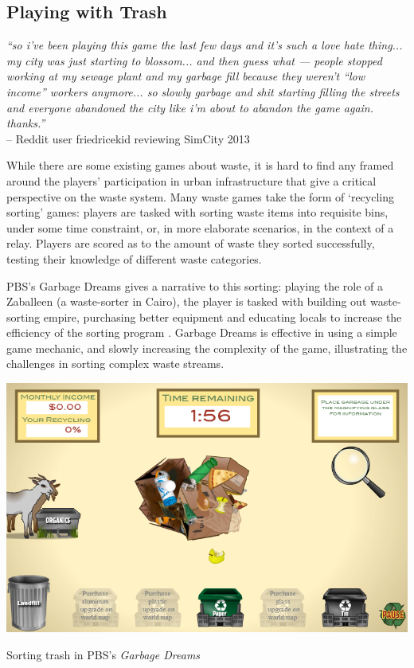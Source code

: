 \documentclass[nofonts,nols,justified,nobib]{tufte-book}
\begin{document}
\subsection*{Playing with Trash}

\begin{flushright}
\emph{``so i've been playing this game the last few days and it's such a love hate thing... my city was just starting to blossom... and then guess what --- people stopped working at my sewage plant and my garbage fill because they weren't ``low income'' workers anymore... so slowly garbage and shit starting filling the streets and everyone abandoned the city like i'm about to abandon the game again. thanks.''}\cite{friedricekid_is_2017}\\
-- Reddit user friedricekid reviewing SimCity 2013
\end{flushright}

While there are some existing games about waste, it is hard to find any framed around the players' participation in urban infrastructure that give a critical perspective on the waste system. Many waste games take the form of `recycling sorting' games: players are tasked with sorting waste items into requisite bins, under some time constraint, or, in more elaborate scenarios, in the context of a relay. Players are scored as to the amount of waste they sorted successfully, testing their knowledge of different waste categories. 

PBS's Garbage Dreams gives a narrative to this sorting: playing the role of a Zaballeen (a waste-sorter in Cairo), the player is tasked with building out waste-sorting empire, purchasing better equipment and educating locals to increase the efficiency of the sorting program \cite{iskander_garbage_2011}. Garbage Dreams is effective in using a simple game mechanic, and slowly increasing the complexity of the game, illustrating the challenges in sorting complex waste streams. 


\begin{marginfigure}
\includegraphics[width=\textwidth]{img/1/garbage-dreams-1.png}
\caption{Sorting trash in PBS's \emph{Garbage Dreams} \cite{iskander_garbage_2011}}
\end{marginfigure}
\end{document}
